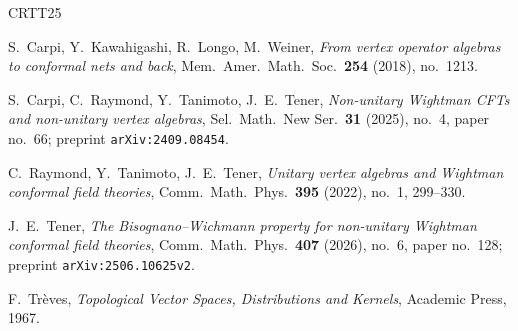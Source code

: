 \documentclass[11pt,a4paper]{article}
\theoremstyle{definition}
\begin{document}
\begin{thebibliography}{CRTT25}

S.~Carpi, Y.~Kawahigashi, R.~Longo, M.~Weiner,
\textit{From vertex operator algebras to conformal nets and back},
Mem.\ Amer.\ Math.\ Soc.\ \textbf{254} (2018), no.~1213.

S.~Carpi, C.~Raymond, Y.~Tanimoto, J.~E.~Tener,
\textit{Non-unitary Wightman CFTs and non-unitary vertex algebras},
Sel.\ Math.\ New Ser.\ \textbf{31} (2025), no.~4, paper no.~66;
preprint \texttt{arXiv:2409.08454}.

C.~Raymond, Y.~Tanimoto, J.~E.~Tener,
\textit{Unitary vertex algebras and Wightman conformal field theories},
Comm.\ Math.\ Phys.\ \textbf{395} (2022), no.~1, 299--330.

J.~E.~Tener,
\textit{The Bisognano--Wichmann property for non-unitary Wightman conformal field theories},
Comm.\ Math.\ Phys.\ \textbf{407} (2026), no.~6, paper no.~128;
preprint \texttt{arXiv:2506.10625v2}.

F.~Tr\`eves,
\textit{Topological Vector Spaces, Distributions and Kernels},
Academic Press, 1967.

\end{thebibliography}
\end{document}
